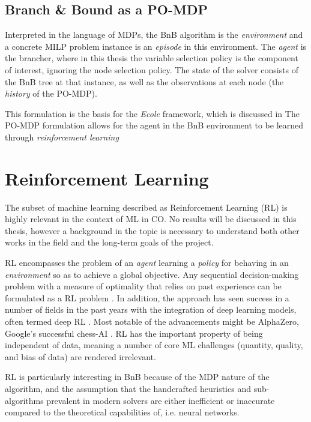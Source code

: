 \subsection{Branch \& Bound as a \gls{PO-MDP}}

Interpreted in the language of \gls{MDP}s, the \gls{BnB} algorithm is the \textit{environment} and a concrete \gls{MILP} problem instance is an \textit{episode} in this environment. The \textit{agent} is the brancher, where in this thesis the variable selection policy is the component of interest, ignoring the node selection policy. The state of the solver consists of the \gls{BnB} tree at that instance, as well as the observations at each node (the \textit{history} of the \gls{PO-MDP}).

This formulation is the basis for the \textit{Ecole} framework, which is discussed in 
The \gls{PO-MDP} formulation allows for the agent in the \gls{BnB} environment to be learned through \textit{reinforcement learning}


\section{Reinforcement Learning}

The subset of machine learning described as Reinforcement Learning (\gls{RL}) is highly relevant in the context of \gls{ML} in \gls{CO}. No results will be discussed in this thesis, however a background in the topic is necessary to understand both other works in the field and the long-term goals of the project.

\gls{RL} encompasses the problem of an \textit{agent} learning a \textit{policy} for behaving in an \textit{environment} so as to achieve a global objective. Any sequential decision-making problem with a measure of optimality that relies on past experience can be formulated as a \gls{RL} problem \cite{francois2018introduction}. In addition, the approach has seen success in a number of fields in the past years with the integration of deep learning models, often termed deep \gls{RL} \cite{francois2018introduction}. Most notable of the advancements might be AlphaZero, Google's successful chess-AI \cite{silver2017mastering}. \gls{RL} has the important property of being independent of data, meaning a number of core \gls{ML} challenges (quantity, quality, and bias of data) are rendered irrelevant. 

\gls{RL} is particularly interesting in \gls{BnB} because of the \gls{MDP} nature of the algorithm, and the assumption that the handcrafted heuristics and sub-algorithms prevalent in modern solvers are either inefficient or inaccurate compared to the theoretical capabilities of, i.e. neural networks. 

